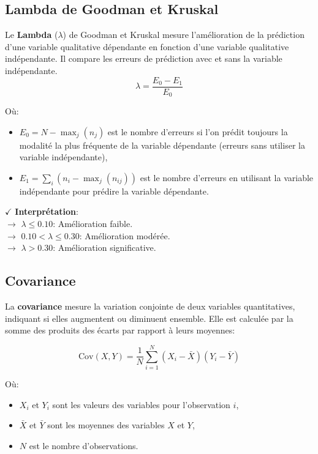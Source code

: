 \subsection{Lambda de Goodman et Kruskal}

Le \textbf{Lambda} (\(\lambda\)) de Goodman et Kruskal \cite{gm} mesure l'amélioration de la prédiction d'une variable qualitative dépendante en fonction d'une variable qualitative indépendante. Il compare les erreurs de prédiction avec et sans la variable indépendante.
\[
\lambda = \frac{E_0 - E_1}{E_0}
\]

Où:
\begin{itemize}
    \item \(E_0 = N - \max_j(n_j)\) est le nombre d'erreurs si l'on prédit toujours la modalité la plus fréquente de la variable dépendante (erreurs sans utiliser la variable indépendante),
    \item \(E_1 = \sum_{i} \left( n_i - \max_j \left( n_{ij} \right) \right)\) est le nombre d'erreurs en utilisant la variable indépendante pour prédire la variable dépendante.
\end{itemize}

\textbf{\(\checkmark\)} \textbf{Interprétation}:\\
\noindent \textbf{\(\rightarrow\)} \( \lambda \leq 0.10 \): Amélioration faible.\\
\textbf{\(\rightarrow\)}  \( 0.10 < \lambda \leq 0.30 \): Amélioration modérée.\\
\textbf{\(\rightarrow\)}  \( \lambda > 0.30 \): Amélioration significative.

\subsection{Covariance}

La \textbf{covariance} mesure la variation conjointe de deux variables quantitatives, indiquant si elles augmentent ou diminuent ensemble. Elle est calculée par la somme des produits des écarts par rapport à leurs moyennes:

\[
\text{Cov}(X, Y) = \frac{1}{N} \sum_{i=1}^{N} (X_i - \bar{X})(Y_i - \bar{Y})
\]

Où:
\begin{itemize}
    \item \(X_i\) et \(Y_i\) sont les valeurs des variables pour l’observation \(i\),
    \item \(\bar{X}\) et \(\bar{Y}\) sont les moyennes des variables \(X\) et \(Y\),
    \item \(N\) est le nombre d'observations.
\end{itemize}

